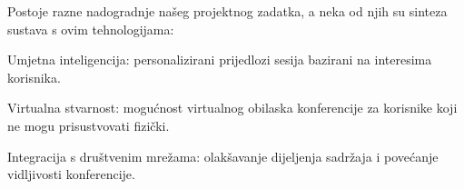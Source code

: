 		\newpage
		
		Postoje razne nadogradnje našeg projektnog zadatka, a neka od njih su sinteza sustava s ovim tehnologijama:
		\begin{packed_item}
			\item Umjetna inteligencija: personalizirani prijedlozi sesija bazirani na interesima korisnika.
			\item Virtualna stvarnost: mogućnost virtualnog obilaska konferencije za korisnike koji ne mogu prisustvovati fizički.
			\item Integracija s društvenim mrežama: olakšavanje dijeljenja sadržaja i povećanje vidljivosti konferencije.
		\end{packed_item}

		
		
		\eject
		
		
	